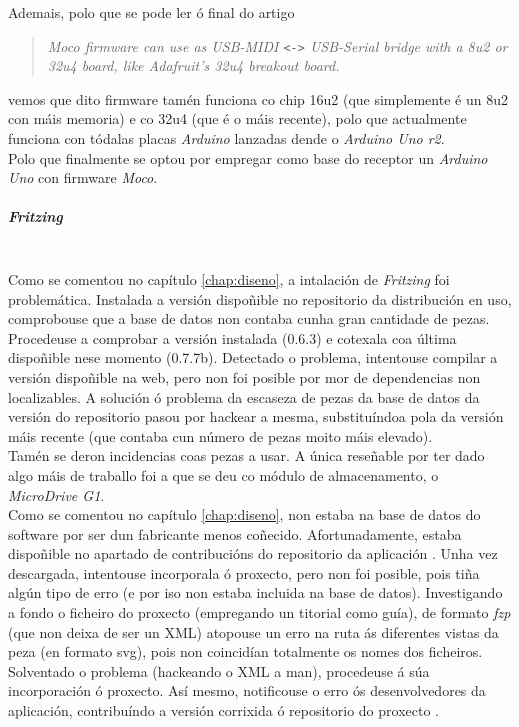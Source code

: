     Ademais, polo que se pode ler ó final do artigo \\

    \begin{quotation}
     \slshape
     Moco firmware can use as USB-MIDI \verb|<->| USB-Serial bridge with a 8u2
     or 32u4 board, like Adafruit’s 32u4 breakout board.
    \end{quotation}

    vemos que dito firmware tamén funciona co chip 16u2 (que simplemente é un
    8u2 con máis memoria) e co 32u4 (que é o máis recente), polo que
    actualmente funciona con tódalas placas \textit{Arduino} lanzadas dende o
    \textit{Arduino Uno r2}. \\

    Polo que finalmente se optou por empregar como base do receptor un
    \textit{Arduino Uno} con firmware \textit{Moco}.

    \subparagraph{Fritzing}\mbox{}\\

    Como se comentou no capítulo \ref{chap:diseno}, a intalación de
    \textit{Fritzing} foi problemática. Instalada a versión dispoñible no
    repositorio da distribución en uso, comprobouse que a base de datos non
    contaba cunha gran cantidade de pezas. Procedeuse a comprobar a versión
    instalada (0.6.3) e cotexala coa última dispoñible nese momento (0.7.7b).
    Detectado o problema, intentouse compilar a versión dispoñible na web, pero
    non foi posible por mor de dependencias non localizables. A solución ó
    problema da escaseza de pezas da base de datos da versión do repositorio
    pasou por hackear a mesma, substituíndoa pola da versión máis recente (que
    contaba cun número de pezas moito máis elevado). \\

    Tamén se deron incidencias coas pezas a usar. A única reseñable por ter
    dado algo máis de traballo foi a que se deu co módulo de almacenamento, o
    \textit{MicroDrive G1}. \\

    Como se comentou no capítulo \ref{chap:diseno}, non estaba na base de datos
    do software por ser dun fabricante menos coñecido. Afortunadamente, estaba
    dispoñible no apartado de contribucións do repositorio da aplicación
    \cite{FioContribucionsFritzing}. Unha vez descargada, intentouse
    incorporala ó proxecto, pero non foi posible, pois tiña algún tipo de erro
    (e por iso non estaba incluida na base de datos). Investigando a fondo o
    ficheiro do proxecto (empregando un titorial \cite{TitorialFritzing} como
    guía), de formato \textit{fzp} (que non deixa de ser un XML) atopouse un
    erro na ruta ás diferentes vistas da peza (en formato svg), pois non
    coincidían totalmente os nomes dos ficheiros. Solventado o problema
    (hackeando o XML a man), procedeuse á súa incorporación ó proxecto. Así
    mesmo, notificouse o erro ós desenvolvedores da aplicación, contribuíndo a
    versión corrixida ó repositorio do proxecto \cite{ContribucionFritzing}.
    
